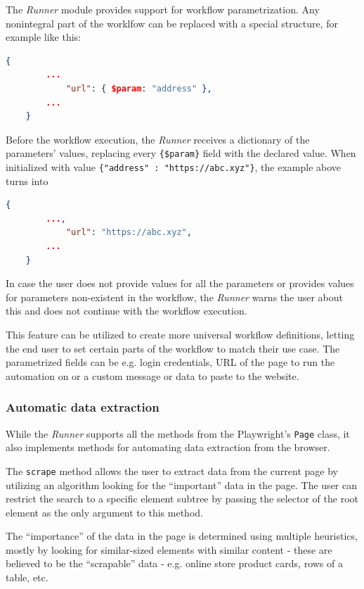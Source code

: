 The \textit{Runner} module provides support for workflow parametrization. 
Any nonintegral part of the worklfow can be replaced with a special structure, for example like this:
\begin{lstlisting}[language=json]
    {
        ...
            "url": { $param: "address" },
        ...
    }
\end{lstlisting}

Before the workflow execution, the \textit{Runner} receives a dictionary of the parameters' values, replacing every \texttt{\{\$param\}} field with the declared value.
When initialized with value \texttt{\{"address" : "https://abc.xyz"\}}, the example above turns into

\begin{lstlisting}[language=json]
    {
        ...,
            "url": "https://abc.xyz",
        ...
    }
\end{lstlisting}

In case the user does not provide values for all the parameters or provides values for parameters non-existent in the workflow, the \textit{Runner} warns the user about this and does not continue with the workflow execution.

This feature can be utilized to create more universal workflow definitions, letting the end user to set certain parts of the workflow to match their use case.
The parametrized fields can be e.g. login credentials, URL of the page to run the automation on or a custom message or data to paste to the website.

\subsubsection{Automatic data extraction}

While the \textit{Runner} supports all the methods from the Playwright's \texttt{Page} class,
it also implements methods for automating data extraction from the browser.

The \texttt{scrape} method allows the user to extract data from the current page by utilizing an algorithm 
looking for the ``important'' data in the page. The user can restrict the search to a specific element subtree
by passing the selector of the root element as the only argument to this method.

The ``importance'' of the data in the page is determined using multiple heuristics, mostly by looking for 
similar-sized elements with similar content - these are believed to be the ``scrapable'' data - e.g. online store product cards, rows of a table, etc.

